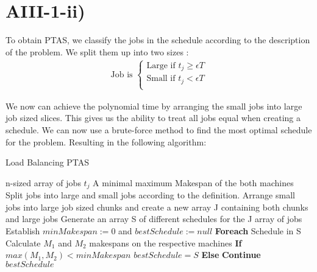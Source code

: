 \section*{AIII-1-ii)}
\label{approx-3-1-ii}

To obtain PTAS, we classify the jobs in the schedule according to the description of the problem.
We split them up into two sizes :
\begin{align*}
    \text{Job is } \begin{cases}
        \text{Large} \text{ if } t_j \ge \epsilon T \\
        \text{Small} \text{ if } t_j < \epsilon T \\
    \end{cases}
\end{align*}

We now can achieve the polynomial time by arranging the small jobs into large job sized slices.
This gives us the ability to treat all jobs equal when creating a schedule.
We can now use a brute-force method to find the most optimal schedule for the problem.
Resulting in the following algorithm:
\begin{algorithm}
  \caption{Load Balancing PTAS}
  \label{alg:load_balancing_ptas}
  \begin{algorithmic}
    \renewcommand{\algorithmicrequire}{\textbf{Input:}}
    \renewcommand{\algorithmicensure}{\textbf{Output:}}
    \algnewcommand{}
    \algnewcommand\Operation{\item[\algorithmicoperation]}
    \Require n-sized array of jobs $ t_j $
    \Ensure A minimal maximum Makespan of the both machines
    \Operation
    \State Split jobs into large and small jobs according to the definition. 
    \State Arrange small jobs into large job sized chunks and create a new array J containing both chunks and large jobs
    \State Generate an array S of different schedules for the J array of jobs
    \State Establish $ minMakespan := 0 $ and $ bestSchedule := null $
    \State \textbf{Foreach} Schedule in S
    \State \hspace{\algorithmicindent} Calculate $ M_1 $ and $ M_2 $ makespans on the respective machines
    \State \hspace{\algorithmicindent} \textbf{If} $ max(M_1,M_2) < minMakespan $
    \State \hspace{\algorithmicindent} \hspace{\algorithmicindent} $ bestSchedule = S $ 
    \State \hspace{\algorithmicindent} \textbf{Else}
    \State \hspace{\algorithmicindent} \hspace{\algorithmicindent} \textbf{Continue} \\
    \Return $ bestSchedule $
  \end{algorithmic}
\end{algorithm}

